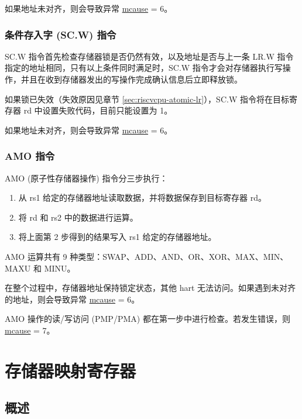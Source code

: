 \documentclass[main\_\_CN.tex]{subfiles}
\begin{document}
如果地址未对齐，则会导致异常 \hyperref[regdesc:MCAUSE]{mcause} = 6。

\subsubsection{条件存入字 (SC.W) 指令}
\label{sec:riscvcpu-atomic-sc}

SC.W 指令首先检查存储器锁是否仍然有效，以及地址是否与上一条 LR.W 指令指定的地址相同，只有以上条件同时满足时，SC.W 指令才会对存储器执行写操作，并且在收到存储器发出的写操作完成确认信息后立即释放锁。

如果锁已失效（失效原因见章节 \ref{sec:riscvcpu-atomic-lr}），SC.W 指令将在目标寄存器 rd 中设置失败代码，目前只能设置为 1。

如果地址未对齐，则会导致异常 \hyperref[regdesc:MCAUSE]{mcause} = 6。

\subsubsection{AMO 指令}
\label{sec:riscvcpu-atomic-amo}

AMO (原子性存储器操作) 指令分三步执行：

\begin{enumerate}
    \item 从 rs1 给定的存储器地址读取数据，并将数据保存到目标寄存器 rd。
    \item 将 rd 和 rs2 中的数据进行运算。
    \item 将上面第 2 步得到的结果写入 rs1 给定的存储器地址。
\end{enumerate}

AMO 运算共有 9 种类型：SWAP、ADD、AND、OR、XOR、MAX、MIN、MAXU 和 MINU。

在整个过程中，存储器地址保持锁定状态，其他 hart 无法访问。如果遇到未对齐的地址，则会导致异常 \hyperref[regdesc:MCAUSE]{mcause} = 6。

AMO 操作的读/写访问 (PMP/PMA) 都在第一步中进行检查。若发生错误，则 \hyperref[regdesc:MCAUSE]{mcause} = 7。

\newpage
\section{存储器映射寄存器}
\label{sec:riscvcpu-tcip}

\subsection{概述}
\label{sec:riscvcpu-tcip-overview}
\end{document}
